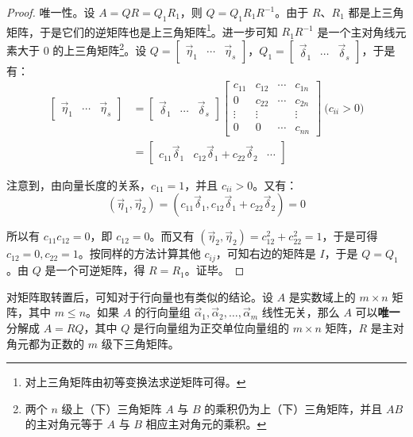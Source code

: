 \begin{proof}
	唯一性。设 $A = QR = Q_1 R_1$，则 $Q = Q_1 R_1 R^{-1}$。由于 $R$、$R_1$ 都是上三角矩阵，于是它们的逆矩阵也是上三角矩阵\footnote{对上三角矩阵由初等变换法求逆矩阵可得。}。进一步可知 $R_1 R^{-1}$ 是一个主对角线元素大于 $0$ 的上三角矩阵\footnote{两个 $n$ 级上（下）三角矩阵 $A$ 与 $B$ 的乘积仍为上（下）三角矩阵，并且 $AB$ 的主对角元等于 $A$ 与 $B$ 相应主对角元的乘积。}。设 $Q = \begin{bmatrix} \vec \eta_1 & \cdots & \vec \eta_s \end{bmatrix}$，$Q_1 = \begin{bmatrix} \vec \delta_1 & \cdots & \vec \delta_s \end{bmatrix}$，于是有：
	$$
	\begin{aligned}
		\begin{bmatrix} \vec \eta_1 & \cdots & \vec \eta_s \end{bmatrix} &= \begin{bmatrix} \vec \delta_1 & \cdots & \vec \delta_s \end{bmatrix}
		\begin{bmatrix}
			c_{11} &  c_{12} & \cdots & c_{1n}
			\\
			0 & c_{22} & \cdots & c_{2n}
			\\
			\vdots & \vdots & & \vdots
			\\
			0 & 0 & \cdots & c_{nn}
		\end{bmatrix}
		\pod{c_{ii} > 0}
		\\&=
		\begin{bmatrix} c_{11} \vec \delta_1 & c_{12} \vec \delta_1 + c_{22} \vec \delta_2 & \cdots \end{bmatrix}
	\end{aligned}
	$$

	注意到，由向量长度的关系，$c_{11} = 1$，并且 $c_{ii} > 0$。又有：
	$$
	(\vec \eta_1, \vec \eta_2) = (c_{11} \vec \delta_1, c_{12} \vec \delta_1 + c_{22} \vec \delta_2) = 0
	$$

	所以有 $c_{11} c_{12} = 0$，即 $c_{12} = 0$。而又有 $(\vec \eta_2, \vec \eta_2) = c_{12}^2 + c_{22}^2 = 1$，于是可得 $c_{12} = 0, c_{22} = 1$。按同样的方法计算其他 $c_{ij}$，可知右边的矩阵是 $I$，于是 $Q = Q_1$。由 $Q$ 是一个可逆矩阵，得 $R = R_1$。证毕。
\end{proof}

对矩阵取转置后，可知对于行向量也有类似的结论。设 $A$ 是实数域上的 $m \times n$ 矩阵，其中 $m \le n$。如果 $A$ 的行向量组 $\vec \alpha_1, \vec \alpha_2, \ldots, \vec \alpha_m$ 线性无关，那么 $A$ 可以\textbf{唯一}分解成 $A = RQ$，其中 $Q$ 是行向量组为正交单位向量组的 $m \times n$ 矩阵，$R$ 是主对角元都为正数的 $m$ 级下三角矩阵。

